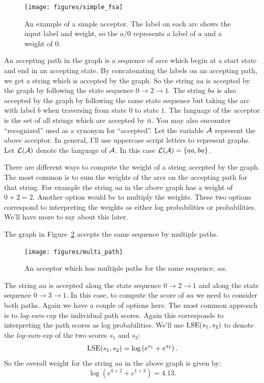 \begin{figure}
    \centering
    \texttt{[image: figures/simple\_fsa]}
    \caption{An example of a simple acceptor. The label on each arc shows the
    input label and weight, so the $a/0$ represents a label of $a$ and a weight
    of $0$.}
    \label{fig:simple_fsa}
\end{figure}

An accepting path in the graph is a sequence of arcs which begin at a start
state and end in an accepting state. By concatenating the labels on an
accepting path, we get a string which is accepted by the graph. So the string
$aa$ is accepted by the graph by following the state sequence $0 \rightarrow 2
\rightarrow 1$. The string $ba$ is also accepted by the graph by following the
same state sequence but taking the arc with label $b$ when traversing from
state $0$ to state $1$. The language of the acceptor is the set of all strings
which are accepted by it. You may also encounter ``recognized'' used as a
synonym for ``accepted''. Let the variable $\mathcal{A}$ represent the above acceptor.
In general, I'll use uppercase script letters to represent graphs. Let
$\mathcal{L}(\mathcal{A})$ denote the language of $\mathcal{A}$. In this case $\mathcal{L}(\mathcal{A})
= \{aa, ba\}$.

There are different ways to compute the weight of a string accepted by the
graph. The most common is to sum the weights of the arcs on the accepting path
for that string. For example the string $aa$ in the above graph has a weight of
$0 + 2 = 2$. Another option would be to multiply the weights. These two options
correspond to interpreting the weights as either log probabilities or
probabilities. We'll have more to say about this later.

The graph in Figure~\ref{fig:multi_path} accepts the same sequence by multiple
paths.

\begin{figure}
    \centering
    \texttt{[image: figures/multi\_path]}
    \caption{An acceptor which has multiple paths for the same sequence, $aa$.}
    \label{fig:multi_path}
\end{figure}

The string $aa$ is accepted along the state sequence $0 \rightarrow 2
\rightarrow 1$ and along the state sequence $0 \rightarrow 3 \rightarrow 1$. In
this case, to compute the score of $aa$ we need to consider both paths. Again
we have a couple of options here. The most common approach is to
\emph{log-sum-exp} the individual path scores. Again this corresponds to
interpreting the path scores as log probabilities. We'll use $\operatorname*{\textrm{LSE}}(s_1, s_2)$
to denote the \emph{log-sum-exp} of the two scores $s_1$ and $s_2$:
\begin{equation}
\operatorname*{\textrm{LSE}}(s_1, s_2) = \log \left( e^{s_1} + e^{s_2}\right).
\end{equation}
So the overall weight for the string $aa$ in the above graph is given by:
$$
\log \left(e^{0 + 2} + e^{1 + 3}\right) = 4.13.
$$

